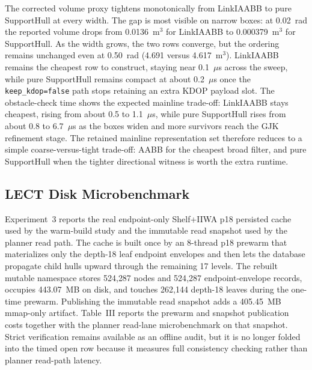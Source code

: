 \documentclass[journal]{IEEEtran}
\begin{document}
The corrected volume proxy tightens monotonically from LinkIAABB to pure
SupportHull at every width. The gap is most visible on narrow boxes: at
0.02~rad the reported volume drops from 0.0136~m$^3$ for LinkIAABB to
0.000379~m$^3$ for SupportHull. As the width grows, the two rows converge, but
the ordering remains unchanged even at 0.50~rad (4.691 versus 4.617~m$^3$).
LinkIAABB remains the cheapest row to construct, staying near 0.1~$\mu$s across
the sweep, while pure SupportHull remains compact at about 0.2~$\mu$s once the
\texttt{keep\_kdop=false} path stops retaining an extra KDOP payload slot. The
obstacle-check time shows the expected mainline trade-off: LinkIAABB stays
cheapest, rising from about 0.5 to 1.1~$\mu$s, while pure SupportHull rises from
about 0.8 to 6.7~$\mu$s as the boxes widen and more survivors reach the GJK
refinement stage. The retained mainline representation set therefore reduces to
a simple coarse-versus-tight trade-off: AABB for the cheapest broad filter, and
pure SupportHull when the tighter directional witness is worth the extra runtime.

\subsection{LECT Disk Microbenchmark}\label{sec:exp_lect_microbench}

Experiment~3 reports the real endpoint-only Shelf+IIWA p18 persisted cache used
by the warm-build study and the immutable read snapshot used by the planner read
path. The cache is built once by an 8-thread p18 prewarm that materializes only
the depth-18 leaf endpoint envelopes and then lets the database propagate child
hulls upward through the remaining 17 levels. The rebuilt mutable namespace
stores 524{,}287 nodes and 524{,}287 endpoint-envelope records, occupies
443.07~MB on disk, and touches 262{,}144 depth-18 leaves during the one-time
prewarm. Publishing the immutable read snapshot adds a 405.45~MB mmap-only
artifact. Table~III reports the prewarm and snapshot publication costs together
with the planner read-lane microbenchmark on that snapshot. Strict verification
remains available as an offline audit, but it is no longer folded into the timed
open row because it measures full consistency checking rather than planner
read-path latency.
\end{document}
